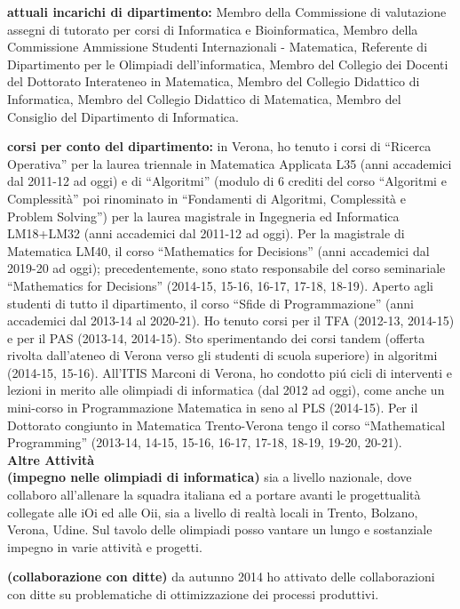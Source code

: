 \documentclass[10pt]{article}
\newcommand{\subvoice}[1] { {\large \bf #1} \smallskip\\ }
\begin{document}
{\bf attuali incarichi di dipartimento:} Membro della Commissione di valutazione assegni di tutorato per corsi di Informatica e Bioinformatica, Membro della Commissione Ammissione Studenti
Internazionali - Matematica, Referente di Dipartimento per le Olimpiadi dell'informatica, Membro del Collegio dei Docenti del Dottorato Interateneo in Matematica, Membro del Collegio Didattico di Informatica, Membro del Collegio Didattico di Matematica, Membro del Consiglio del Dipartimento di Informatica.

{\bf corsi per conto del dipartimento:} in Verona,
ho tenuto i corsi
di ``Ricerca Operativa''
per la laurea triennale in Matematica Applicata L35 (anni accademici dal 2011-12 ad oggi)
e di ``Algoritmi'' (modulo di 6 crediti del corso ``Algoritmi e Complessità'' poi rinominato in ``Fondamenti di Algoritmi, Complessità e Problem Solving'')
per la laurea magistrale in Ingegneria ed Informatica LM18+LM32 (anni accademici dal 2011-12 ad oggi).
Per la magistrale di Matematica LM40, il corso ``Mathematics for Decisions'' (anni accademici dal 2019-20 ad oggi); precedentemente, sono stato responsabile del corso seminariale ``Mathematics for Decisions'' (2014-15, 15-16, 16-17, 17-18, 18-19).
Aperto agli studenti di tutto il dipartimento, il corso ``Sfide di Programmazione'' (anni accademici dal 2013-14 al 2020-21).
Ho tenuto corsi per il TFA (2012-13, 2014-15) e per il PAS (2013-14, 2014-15).
Sto sperimentando dei corsi tandem (offerta rivolta dall'ateneo di Verona verso gli studenti di scuola superiore) in algoritmi (2014-15, 15-16).
All'ITIS Marconi di Verona, ho condotto pi\'u cicli di interventi e lezioni in merito alle olimpiadi di informatica (dal 2012 ad oggi),
come anche un mini-corso in Programmazione Matematica in seno al PLS (2014-15). 
Per il Dottorato congiunto in Matematica Trento-Verona tengo il corso
``Mathematical Programming'' (2013-14, 14-15, 15-16, 16-17, 17-18, 18-19, 19-20, 20-21).\\


\subvoice{Altre Attivit\`a}
\indent
{\bf (impegno nelle olimpiadi di informatica)}
sia a livello nazionale, dove collaboro all'allenare la squadra italiana
ed a portare avanti le progettualit\`a collegate alle iOi ed alle Oii,
sia a livello di realt\`a locali in Trento, Bolzano, Verona, Udine.
Sul tavolo delle olimpiadi posso vantare un lungo e sostanziale impegno in varie attivit\`a e progetti. 

{\bf (collaborazione con ditte)}
da autunno 2014 ho attivato delle collaborazioni con ditte
su problematiche di ottimizzazione dei processi produttivi.
\end{document}
